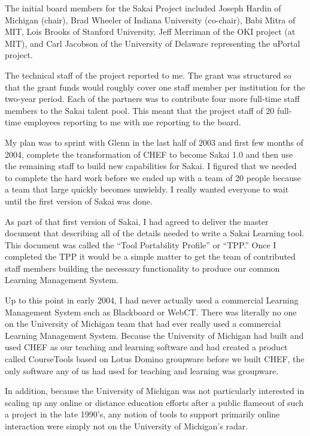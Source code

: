 \documentclass[12pt]{book}
\begin{document}
The initial board members for the Sakai Project included Joseph Hardin of
Michigan (chair), Brad Wheeler of Indiana University (co-chair), Babi
Mitra of MIT, Lois Brooks of Stanford University,
Jeff Merriman of the OKI project (at MIT), and Carl Jacobson of the University of
Delaware representing the uPortal project.


The technical staff of the project reported to me.  The grant was structured
so that the grant funds would roughly cover one staff member per institution
for the two-year period.   Each of the partners was to contribute four more full-time staff
members to the Sakai talent pool.   This meant that the project staff
of 20 full-time employees reporting to me with me reporting
to the board.

My plan was to sprint with Glenn in the last half of 2003 and first few months
of 2004, complete the transformation of CHEF to become Sakai 1.0 and then use
the remaining staff to build new capabilities for Sakai.  I figured that we needed
to complete the hard work before we ended up with a team of 20 people because
a team that large quickly becomes unwieldy.  I really wanted everyone to wait until
the first version of Sakai was done.

As part of that first version of Sakai, I had agreed to deliver the master
document that describing all of the details needed to write a Sakai
Learning tool.
This document was called the ``Tool Portability Profile'' or ``TPP.''
Once I completed the TPP it would be a
simple matter to get the team of contributed staff members
building the necessary functionality to produce
our common Learning Management System.

Up to this point in early 2004,
I had never actually used a commercial Learning Management System
such as Blackboard or WebCT.  There was literally no one on the University of
Michigan team that had ever really used a commercial Learning Management System.
Because the University of Michigan had built and used CHEF as our teaching and
learning software and had created a product called CourseTools based on Lotus Domino groupware before
we built CHEF, the only software any of us had used for teaching and learning
was groupware.

In addition, because the University of Michigan was not particularly interested
in scaling up any online or distance education efforts after a public flameout
of such a project in the late 1990's, any notion of tools to support primarily
online interaction were simply not on the University of Michigan's radar.
\end{document}
